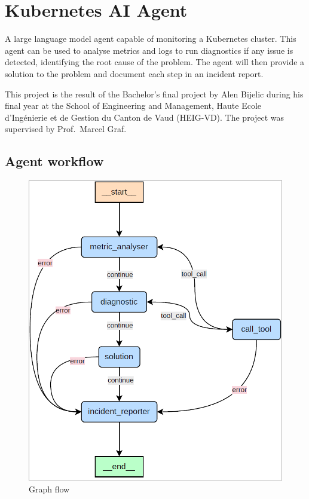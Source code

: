 \hypertarget{kubernetes-ai-agent}{%
\section{Kubernetes AI Agent}\label{kubernetes-ai-agent}}

A large language model agent capable of monitoring a Kubernetes cluster.
This agent can be used to analyse metrics and logs to run diagnostics if
any issue is detected, identifying the root cause of the problem. The
agent will then provide a solution to the problem and document each step
in an incident report.

This project is the result of the Bachelor's final project by Alen
Bijelic during his final year at the School of Engineering and
Management, Haute Ecole d'Ingénierie et de Gestion du Canton de Vaud
(HEIG-VD). The project was supervised by Prof.~Marcel Graf.

\hypertarget{agent-workflow}{%
\subsection{Agent workflow}\label{agent-workflow}}

\begin{figure}
\centering
\includegraphics{img/realisation_langgraphworkflow.png}
\caption{Graph flow}
\end{figure}

